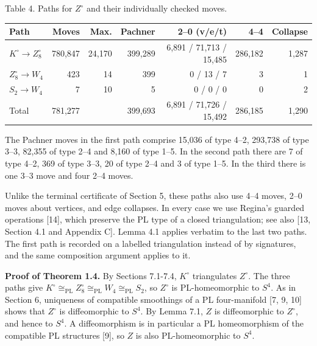 \documentclass[11pt,letterpaper]{article}
\begin{document}
\noindent\begin{minipage}{\linewidth}
\begin{center}\small
Table 4. Paths for $Z^\circ$ and their individually checked moves.\par\smallskip
\setlength{\tabcolsep}{3pt}\footnotesize
\begin{tabular}{lrrrrrr}
\toprule
\textbf{Path} & \textbf{Moves} & \textbf{Max.} & \textbf{Pachner} & \textbf{2--0 (v/e/t)} & \textbf{4--4} & \textbf{Collapse} \\
\midrule
$K^\circ\to Z^\circ_8$ & 780,847 & 24,170 & 399,289 & 6,891 / 71,713 / 15,485 & 286,182 & 1,287 \\
$Z^\circ_8\to W_4$ & 423 & 14 & 399 & 0 / 13 / 7 & 3 & 1 \\
$S_2\to W_4$ & 7 & 10 & 5 & 0 / 0 / 0 & 0 & 2 \\
\midrule
Total & 781,277 &  & 399,693 & 6,891 / 71,726 / 15,492 & 286,185 & 1,290 \\
\bottomrule
\end{tabular}
\end{center}
\end{minipage}\par\smallskip
The Pachner moves in the first path comprise 15,036 of type 4--2, 293,738 of type 3--3, 82,355 of type 2--4 and 8,160 of type 1--5. In the second path there are 7 of type 4--2, 369 of type 3--3, 20 of type 2--4 and 3 of type 1--5. In the third there is one 3--3 move and four 2--4 moves.

Unlike the terminal certificate of Section 5, these paths also use 4--4 moves, 2--0 moves about vertices, and edge collapses. In every case we use Regina's guarded operations [14], which preserve the PL type of a closed triangulation; see also [13, Section 4.1 and Appendix C]. Lemma 4.1 applies verbatim to the last two paths. The first path is recorded on a labelled triangulation instead of by signatures, and the same composition argument applies to it.

\medskip\noindent\textbf{Proof of Theorem 1.4.} By Sections 7.1-7.4, $K^\circ$ triangulates $Z^\circ$. The three paths give $K^\circ\cong_{\mathrm{PL}}Z^\circ_8\cong_{\mathrm{PL}}W_4\cong_{\mathrm{PL}}S_2$, so $Z^\circ$ is PL-homeomorphic to $S^4$. As in Section 6, uniqueness of compatible smoothings of a PL four-manifold [7, 9, 10] shows that $Z^\circ$ is diffeomorphic to $S^4$. By Lemma 7.1, $Z$ is diffeomorphic to $Z^\circ$, and hence to $S^4$. A diffeomorphism is in particular a PL homeomorphism of the compatible PL structures [9], so $Z$ is also PL-homeomorphic to $S^4$.
\end{document}
